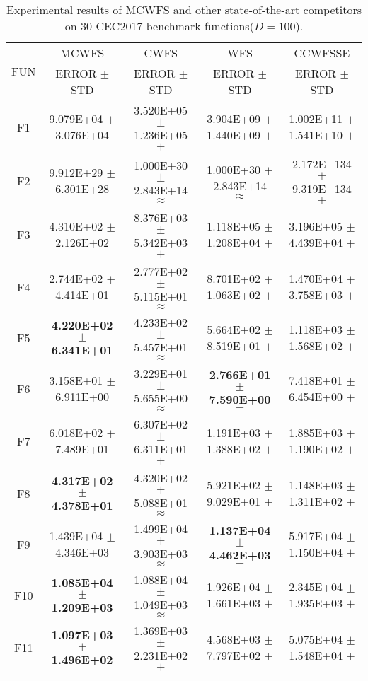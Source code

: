 \documentclass[paper]{ieice}
\begin{document}
\begin{table*}[htbp]  
	\caption{Experimental results of MCWFS and other state-of-the-art competitors on 30 CEC2017 benchmark functions($D = 100$).}  \label{cec2017d100}
	\centering
	\begin{tabular}{c|c|c|c|c}
		\hline
		\multirow{2}{*}{FUN}	&	MCWFS				&	CWFS				&	WFS				&	CCWFSSE				\\   \cline{2-5}
		&	ERROR	$\pm$	STD		&	ERROR	$\pm$	STD		&	ERROR	$\pm$	STD		&	ERROR	$\pm$	STD		\\ \hline
		F1	&	9.079E+04	$\pm$	3.076E+04		&	3.520E+05	$\pm$	1.236E+05	$+$	&	3.904E+09	$\pm$	1.440E+09	$+$	&	1.002E+11	$\pm$	1.541E+10	$+$	\\
		F2	&	9.912E+29	$\pm$	6.301E+28		&	1.000E+30	$\pm$	2.843E+14	$\approx$	&	1.000E+30	$\pm$	2.843E+14	$\approx$	&	2.172E+134	$\pm$	9.319E+134	$+$	\\
		F3	&	4.310E+02	$\pm$	2.126E+02		&	8.376E+03	$\pm$	5.342E+03	$+$	&	1.118E+05	$\pm$	1.208E+04	$+$	&	3.196E+05	$\pm$	4.439E+04	$+$	\\
		F4	&	2.744E+02	$\pm$	4.414E+01		&	2.777E+02	$\pm$	5.115E+01	$\approx$	&	8.701E+02	$\pm$	1.063E+02	$+$	&	1.470E+04	$\pm$	3.758E+03	$+$	\\
		F5	&	\textbf{4.220E+02	$\pm$	6.341E+01}		&	4.233E+02	$\pm$	5.457E+01	$\approx$	&	5.664E+02	$\pm$	8.519E+01	$+$	&	1.118E+03	$\pm$	1.568E+02	$+$	\\
		F6	&	3.158E+01	$\pm$	6.911E+00		&	3.229E+01	$\pm$	5.655E+00	$\approx$	&	\textbf{2.766E+01	$\pm$	7.590E+00}	$-$	&	7.418E+01	$\pm$	6.454E+00	$+$	\\
		F7	&	6.018E+02	$\pm$	7.489E+01		&	6.307E+02	$\pm$	6.311E+01	$+$	&	1.191E+03	$\pm$	1.388E+02	$+$	&	1.885E+03	$\pm$	1.190E+02	$+$	\\
		F8	&	\textbf{4.317E+02	$\pm$	4.378E+01}		&	4.320E+02	$\pm$	5.088E+01	$\approx$	&	5.921E+02	$\pm$	9.029E+01	$+$	&	1.148E+03	$\pm$	1.311E+02	$+$	\\
		F9	&	1.439E+04	$\pm$	4.346E+03		&	1.499E+04	$\pm$	3.903E+03	$\approx$	&	\textbf{1.137E+04	$\pm$	4.462E+03}	$-$	&	5.917E+04	$\pm$	1.150E+04	$+$	\\
		F10	&	\textbf{1.085E+04	$\pm$	1.209E+03}		&	1.088E+04	$\pm$	1.049E+03	$\approx$	&	1.926E+04	$\pm$	1.661E+03	$+$	&	2.345E+04	$\pm$	1.935E+03	$+$	\\
		F11	&	\textbf{1.097E+03	$\pm$	1.496E+02}		&	1.369E+03	$\pm$	2.231E+02	$+$	&	4.568E+03	$\pm$	7.797E+02	$+$	&	5.075E+04	$\pm$	1.548E+04	$+$	\\

\end{tabular}
\end{table*}
\end{document}
